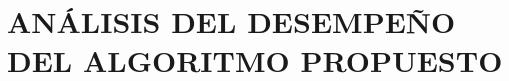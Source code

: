 \chapter[ANÁLISIS DEL DESEMPEÑO]{\Large ANÁLISIS DEL DESEMPEÑO DEL ALGORITMO PROPUESTO}
\label{chap3:anailisis}


\lipsum[]
